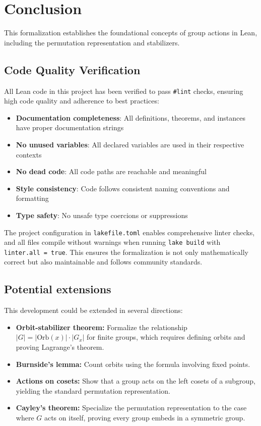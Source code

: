 \documentclass[
  12pt, %
]{assignment}
\begin{document}
\section{Conclusion}
This formalization establishes the foundational concepts of group actions in Lean,
including the permutation representation and stabilizers.

\subsection{Code Quality Verification}
All Lean code in this project has been verified to pass \texttt{\#lint} checks, ensuring high code quality and adherence to best practices:

\begin{itemize}
	\item \textbf{Documentation completeness}: All definitions, theorems, and instances have proper documentation strings
	\item \textbf{No unused variables}: All declared variables are used in their respective contexts
	\item \textbf{No dead code}: All code paths are reachable and meaningful
	\item \textbf{Style consistency}: Code follows consistent naming conventions and formatting
	\item \textbf{Type safety}: No unsafe type coercions or suppressions
\end{itemize}

The project configuration in \texttt{lakefile.toml} enables comprehensive linter checks, and all files compile without warnings when running \texttt{lake build} with \texttt{linter.all = true}. This ensures the formalization is not only mathematically correct but also maintainable and follows community standards.
\iffalse%
	\subsection{Potential extensions}
	This development could be extended in several directions:
	\begin{itemize}
		\item \textbf{Orbit-stabilizer theorem:} Formalize the relationship $|G| = |\text{Orb}(x)| \cdot |G_x|$
		      for finite groups, which requires defining orbits and proving Lagrange's theorem.
		\item \textbf{Burnside's lemma:} Count orbits using the formula involving fixed points.
		\item \textbf{Actions on cosets:} Show that a group acts on the left cosets of a subgroup,
		      yielding the standard permutation representation.
		\item \textbf{Cayley's theorem:} Specialize the permutation representation to the case where
		      $G$ acts on itself, proving every group embeds in a symmetric group.
	\end{itemize}
\end{document}
